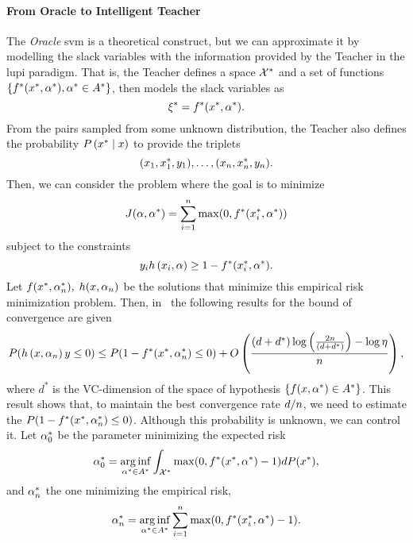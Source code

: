 \paragraph*{From Oracle to Intelligent Teacher\\}
The \emph{Oracle} \acrshort{svm} is a theoretical construct, but we can approximate it by modelling the slack variables with the information provided by the Teacher in the \acrshort{lupi} paradigm.
That is, the Teacher defines a space $\mathcal{X}^*$ and a set of functions $\left\{f^*(x^*, \alpha^*) , \alpha^* \in A^*\right\}$, then models the slack variables as
\begin{equation}
    \nonumber
    \xi^* = f^*(x^*, \alpha^*) .
\end{equation}
From the pairs sampled from some unknown distribution, the Teacher also defines the probability $P\left( x^* \;\middle\vert\; x \right)$ to provide the triplets
\begin{equation}
    \nonumber
    (x_1, x^*_1, y_1), \ldots, (x_n, x^*_n, y_n) .
\end{equation}
Then, we can consider the problem where the goal is to minimize
$$ J(\alpha, \alpha^*) = \sum_{i=1}^n \max(0, f^*(x_i^*, \alpha^*)) $$
subject to the constraints
$$ y_i h\left(x_i, \alpha\right) \geq 1 - f^*(x_i^*, \alpha^*).$$
Let $f(x^*, \alpha^*_n),\; h(x, \alpha_n)$ be the solutions that minimize this empirical risk minimization problem. Then, in~\citet[Proposition~2]{VapnikV09} the following results for the bound of convergence are given
\begin{equation}
    \nonumber
    P(h\left(x, \alpha_n\right) y \leq 0) \leq P(1 - f^*(x^*, \alpha^*_n) \leq 0) + O\left( \frac{(d + d^*) \log\left(\frac{2n}{(d + d^*)} \right) - \log\eta}{n}  \right) ,
\end{equation}
where $d^*$ is the VC-dimension of the space of hypothesis $\left\{f(x, \alpha^*) \in A^*\right\}$. This result shows that, to maintain the best convergence rate $d/n$, we need to estimate the $P(1 - f^*(x^*, \alpha^*_n) \leq 0)$. Although this probability is unknown,  we can control it. Let $\alpha^*_0$ be the parameter minimizing the expected risk
\begin{equation}
    \nonumber
    \alpha^*_0 = \operatorname*{arg\inf}_{\alpha^* \in A^*} \int_{\mathcal{X}^*} \max(0, f^*(x^*, \alpha^*)- 1) dP(x^*) ,
\end{equation}
and $\alpha^*_n$ the one minimizing the empirical risk,
\begin{equation}
    \nonumber
    \alpha^*_n = \operatorname*{arg\inf}_{\alpha^* \in A^*} \sum_{i=1}^n \max(0, f^*(x^*_i, \alpha^*)- 1) .
\end{equation}

